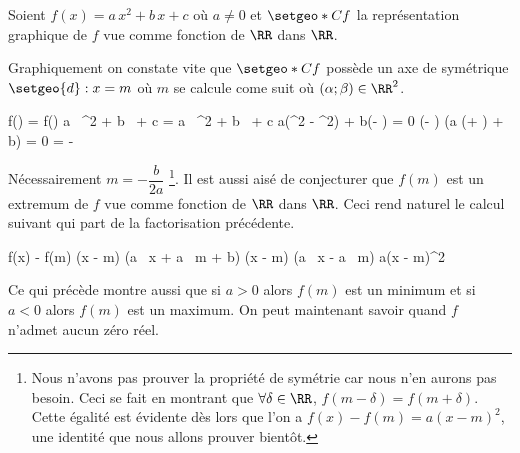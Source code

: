 Soient $f(x) = a \, x^2 + b \, x + c$ où $a \neq 0$ et $\setgeo*{C}{f}$ la représentation graphique de $f$ vue comme fonction de $\RR$ dans $\RR$.

\medskip

Graphiquement on constate vite que $\setgeo*{C}{f}$ possède un axe de symétrique $\setgeo{d}: x = m$ où $m$ se calcule come suit où $(\alpha ; \beta) \in \RR^2$.

\medskip

\begin{stepcalc}[style = sar, ope = \iff] 
	f(\alpha) = f(\beta)
		\explnext{}
	a \, \alpha^2 + b \, \alpha + c = a \, \beta^2 + b \, \beta + c
		\explnext{}
	a(\alpha^2 - \beta^2) + b(\alpha - \beta) = 0
		\explnext{}
	(\alpha - \beta) (a (\alpha + \beta) + b) = 0
									\quad\quad {}
		\explnext{}
	 = - 
\end{stepcalc}

\medskip

Nécessairement $m = - \dfrac{b}{2a}$
\footnote{
	Nous n'avons pas prouver la propriété de symétrie car nous n'en aurons pas besoin.
	Ceci se fait en montrant que $\forall \delta \in \RR$, $f(m - \delta) = f(m + \delta)$.
	Cette égalité est évidente dès lors que l'on a $f(x) - f(m) = a(x - m)^2$, une identité que nous allons prouver bientôt.
}.
Il est aussi aisé de conjecturer que $f(m)$ est un extremum de $f$ vue comme fonction de $\RR$ dans $\RR$. Ceci rend naturel le calcul suivant qui part de la factorisation  précédente.

\medskip

\begin{stepcalc}[style = sar] 
	f(x) - f(m)
		\explnext{}
	(x - m) (a \, x + a \, m + b)
	(x - m) (a \, x - a \, m)
		\explnext{}
	a(x - m)^2
\end{stepcalc}

\medskip

Ce qui précède montre aussi que 
si $a > 0$ alors $f(m)$ est un minimum et
si $a < 0$ alors $f(m)$ est un maximum. On peut maintenant savoir quand $f$ n'admet aucun zéro réel.

